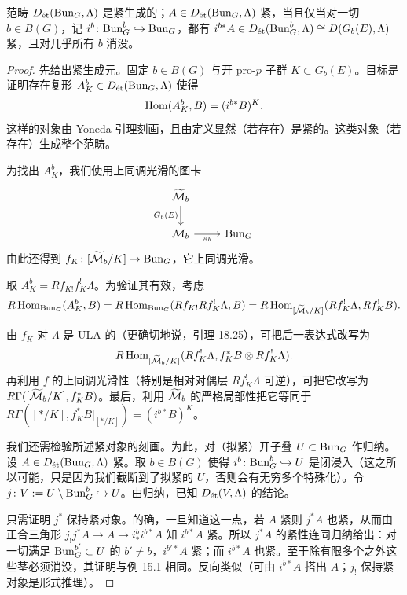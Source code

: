 \begin{theorem}
范畴 $D_{\et}(\Bun_G,\Lambda)$ 是紧生成的；$A\in D_{\et}(\Bun_G,\Lambda)$ 紧，当且仅当对一切 $b\in B(G)$，记 $i^b\colon\Bun^b_G\hookrightarrow\Bun_G$，都有 $i^{b*}A\in D_{\et}(\Bun^b_G,\Lambda)\cong D(G_b(E),\Lambda)$ 紧，且对几乎所有 $b$ 消没。
\end{theorem}

\begin{proof}
先给出紧生成元。固定 $b\in B(G)$ 与开 pro-$p$ 子群 $K\subset G_b(E)$。目标是证明存在复形 $A^b_K\in D_{\et}(\Bun_G,\Lambda)$ 使得
\[
\Hom(A^b_K,B)=(i^{b*}B)^K.
\]
这样的对象由 Yoneda 引理刻画，且由定义显然（若存在）是紧的。这类对象（若存在）生成整个范畴。

为找出 $A^b_K$，我们使用上同调光滑的图卡
\[
\begin{tikzcd}
\wt\cM_b \arrow[d, "G_b(E)"'] \\
\cM_b \arrow[r, "\pi_b"'] & \Bun_G
\end{tikzcd}
\]
由此还得到 $f_K\colon[\wt\cM_b/K]\to\Bun_G$，它上同调光滑。

取 $A^b_K=Rf_{K!}f_K^!\Lambda$。为验证其有效，考虑
\[
R\Hom_{\Bun_G}(A^b_K,B)=R\Hom_{\Bun_G}(Rf_{K!}Rf_K^!\Lambda,B)=R\Hom_{[\wt\cM_b/K]}(Rf_K^!\Lambda,Rf_K^!B).
\]

由 $f_K$ 对 $\Lambda$ 是 ULA 的（更确切地说，引理 18.25），可把后一表达式改写为
\[
R\Hom_{[\wt\cM_b/K]}(Rf_K^!\Lambda,f_K^*B\otimes Rf_K^!\Lambda).
\]
再利用 $f$ 的上同调光滑性（特别是相对对偶层 $Rf_K^!\Lambda$ 可逆），可把它改写为 $R\Gamma([\wt\cM_b/K],f_K^*B)$。最后，利用 $\wt\cM_b$ 的严格局部性把它等同于 $R\Gamma([\ast/K],f_K^*B|_{[\ast/K]})=(i^{b*}B)^K$。

我们还需检验所述紧对象的刻画。为此，对（拟紧）开子叠 $U\subset\Bun_G$ 作归纳。设 $A\in D_{\et}(\Bun_G,\Lambda)$ 紧。取 $b\in B(G)$ 使得 $i^b\colon\Bun^b_G\hookrightarrow U$ 是闭浸入（这之所以可能，只是因为我们截断到了拟紧的 $U$，否则会有无穷多个特殊化）。令 $j\colon V:=U\setminus\Bun^b_G\hookrightarrow U$。由归纳，已知 $D_{\et}(V,\Lambda)$ 的结论。

只需证明 $j^*$ 保持紧对象。的确，一旦知道这一点，若 $A$ 紧则 $j^*A$ 也紧，从而由正合三角形 $j_!j^*A\to A\to i^b_*i^{b*}A$ 知 $i^{b*}A$ 紧。所以 $j^*A$ 的紧性连同归纳给出：对一切满足 $\Bun^{b'}_G\subset U$ 的 $b'\ne b$，$i^{b'*}A$ 紧；而 $i^{b*}A$ 也紧。至于除有限多个之外这些茎必须消没，其证明与例 15.1 相同。反向类似（可由 $i^{b*}A$ 搭出 $A$；$j_!$ 保持紧对象是形式推理）。


\end{proof}
